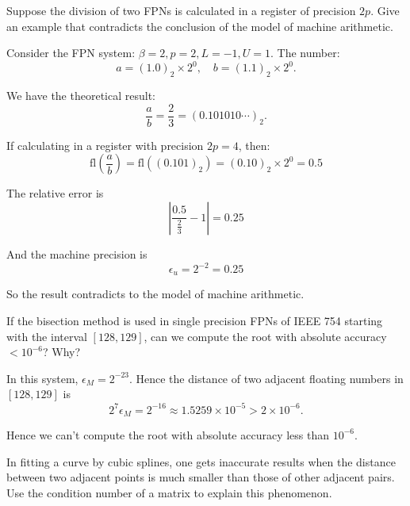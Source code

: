 \documentclass[11pt]{elegantbook}
\begin{document}
\vspace{1em}

\begin{problem}
  Suppose the division of two FPNs is calculated in a register of precision $2p$. Give an example that contradicts the conclusion of the model of machine arithmetic.
\end{problem}

\begin{solution}
  Consider the FPN system: $\beta=2, p=2, L=-1, U=1$. The number:
  \begin{equation*}
    a=(1.0)_2\times 2^{0},\quad b=(1.1)_2\times 2^{0}.
  \end{equation*}

  We have the theoretical result:
  \begin{equation*}
    \frac{a}{b}=\frac{2}{3}=(0.101010\cdots)_2.
  \end{equation*}

  If calculating in a register with precision $2p=4$, then:
  \begin{equation*}
    \text{fl}\left(\frac{a}{b}\right)=\text{fl}((0.101)_2)=(0.10)_2\times 2^{0}=0.5
  \end{equation*}

  The relative error is
  \begin{equation*}
    \left|\frac{0.5}{\frac{2}{3}}-1\right|=0.25
  \end{equation*}

  And the machine precision is
  \begin{equation*}
    \epsilon_u=2^{-2}=0.25
  \end{equation*}

  So the result contradicts to the model of machine arithmetic.

\end{solution}

\begin{problem}
  If the bisection method is used in single precision FPNs of IEEE 754 starting with the interval $[128,129]$, can we compute the root with absolute accuracy $<10^{-6}$? Why?
\end{problem}

\begin{solution}
  In this system, $\epsilon_M=2^{-23}$. Hence the distance of two adjacent floating numbers in $[128,129]$ is
  \begin{equation*}
    2^7\epsilon_M=2^{-16}\approx 1.5259\times 10^{-5}>2\times 10^{-6}.
  \end{equation*}

  Hence we can't compute the root with absolute accuracy less than $10^{-6}$.
\end{solution}

\begin{problem}
  In fitting a curve by cubic splines, one gets inaccurate results when the distance between two adjacent points is much smaller than those of other adjacent pairs. Use the condition number of a matrix to explain this phenomenon.
\end{problem}

\begin{solution}
\end{solution}
\end{document}
